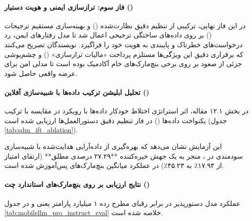 \paragraph*{فاز سوم: ترازسازی ایمنی و هویت دستیار ()}
در این فاز نهایی، ترکیبی از تنظیم دقیق نظارت‌شده () و بهینه‌سازی مستقیم ترجیحات () بر روی داده‌های ساختگی ترجیحی اعمال شد تا مدل رفتارهای ایمن، رد درخواست‌های خطرناک و پایبندی به هویت خود را فراگیرد. نویسندگان تصریح می‌کنند که برقراری دقیق این ویژگی‌ها مستلزم پرداخت «مالیات ترازسازی» () و چشم‌پوشی جزئی از صعود بر روی برخی بنچ‌مارک‌های خام آکادمیک بوده است تا مدلی امن برای عرضه واقعی حاصل شود.

\paragraph*{تحلیل ابلیشن ترکیب داده‌ها با شبیه‌سازی آفلاین ()}
در بخش ۱۲.۱ مقاله، اثر استراتژی اختلاط خودکار داده‌ها با رویکرد  \cite{chang2025sdm} در مقایسه با ترکیب یکنواخت داده‌ها () در فاز تنظیم دقیق دستورالعمل‌ها ارزیابی شده است (جدول \ref{tab:sdm_ift_ablation}).

\begin{table}[htbp]
\centering
\caption{مقایسه عملکرد فاز  بر مبنای ترکیب یکنواخت و ترکیب هدایت‌شده با }
\label{tab:sdm_ift_ablation}
\end{table}

این آزمایش نشان می‌دهد که بهره‌گیری از داده‌آرایی هدایت‌شده با شبیه‌سازی سودمندی در ، منجر به یک جهش خیره‌کننده **۲۷.۲۹ درصدی مطلق** (ارتقای امتیاز از ۱۷.۹۴٪ به ۴۵.۲۳٪) در عملکرد میانگین بنچ‌مارک‌های پس‌آموزش شده است.

\paragraph*{نتایج ارزیابی بر روی بنچ‌مارک‌های استاندارد چت ()}
عملکرد مدل دستورپذیر  در برابر رقبای مطرح رده ۱ میلیارد پارامتر یعنی  \cite{team2025gemma3} و  \cite{grattafiori2024llama3} در جدول \ref{tab:mobilellm_pro_instruct_eval} خلاصه شده است.


